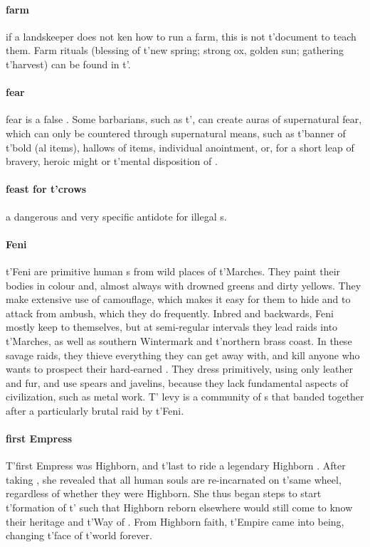 \paragraph{farm} if a landskeeper does not ken how to run a farm, this is not t'\allowbreak document to teach them. Farm rituals (blessing of t'\allowbreak new spring; strong ox, golden sun; gathering t'\allowbreak harvest) can be found in t'\allowbreak {}.
\paragraph{fear} fear is a false . Some barbarians, such as t'\allowbreak {}, can create auras of supernatural fear, which can only be countered through supernatural means, such as t'\allowbreak banner of t'\allowbreak bold (al items), hallows of items, individual anointment, or, for a short leap of bravery, heroic might or t'\allowbreak mental disposition of . 
\paragraph{feast for t'crows} a dangerous and very specific antidote for illegal s.
\paragraph{Feni} t'\allowbreak Feni are primitive human s from wild places of t'\allowbreak Marches. They paint their bodies in colour and, almost always with drowned greens and dirty yellows. They make extensive use of camouflage, which makes it easy for them to hide and to attack from ambush, which they do frequently. Inbred and backwards, Feni mostly keep to themselves, but at semi-regular intervals they lead raids into t'\allowbreak Marches, as well as southern Wintermark and t'\allowbreak northern brass coast. In these savage raids, they thieve everything they can get away with, and kill anyone who wants to prospect their hard-earned . They dress primitively, using only leather and fur, and use spears and javelins, because they lack fundamental aspects of civilization, such as metal work. T' levy is a community of s that banded together after a particularly brutal raid by t'\allowbreak Feni.
\paragraph{first Empress} T'first Empress was Highborn, and t'\allowbreak last to ride a legendary Highborn . After taking , she revealed that all human souls are re-incarnated on t'\allowbreak same wheel, regardless of whether they were Highborn. She thus began steps to start t'\allowbreak formation of t'\allowbreak {} such that Highborn reborn elsewhere would still come to know their heritage and t'\allowbreak Way of . From Highborn faith, t'\allowbreak Empire came into being, changing t'\allowbreak face of t'\allowbreak world forever.
